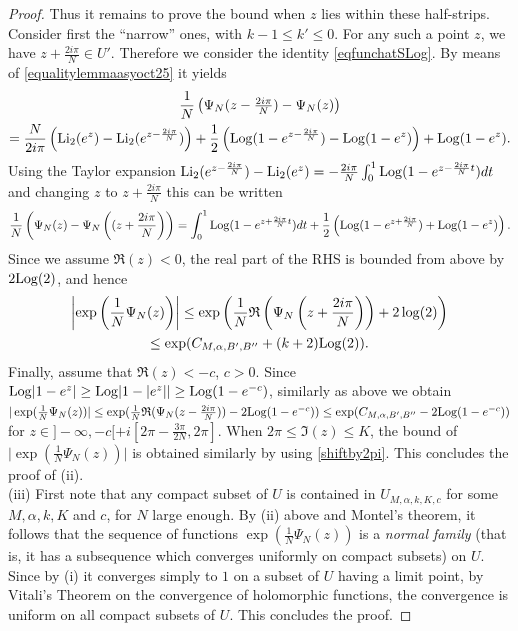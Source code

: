 \documentclass[11pt]{amsart}
\newcommand{\Log}{{\rm Log}}
\begin{document}
{\begin{proof}
Thus it remains to prove the bound when $z$ lies within these half-strips. Consider first the ``narrow'' ones, with $k-1\leq k'\leq 0$. For any such a point $z$, we have $z+\textstyle{\frac{2i\pi}{N}}\in U'$. Therefore we consider the identity \eqref{eqfunchatSLog}. By means of \eqref{equalitylemmaasyoct25} it yields
\begin{multline*}
\frac{1}{N}  \left(\Psi_N(z-\textstyle{\frac{2i\pi}{N}}) - \Psi_N(z)\right)   \\ = \frac{N}{2i\pi}\left({\rm Li_2}(e^{z})-{\rm Li_2}(e^{z-\frac{2i\pi}{N}}) \right) +\frac{1}{2}\left(\Log(1-e^{z-\frac{2i\pi}{N}})-\Log(1-e^{z}) \right)+ \Log(1-e^{z}).
\end{multline*}
Using the Taylor expansion $\textstyle {\rm Li_2}(e^{z-\frac{2i\pi}{N}}) - {\rm Li_2}(e^{z})  = - \frac{2i\pi}{N} \int_0^1 \Log(1-e^{z-\frac{2i\pi}{N}t}) dt$ and changing $z$ to $\textstyle  z+\frac{2i\pi}{N}$ this can be written
$$\frac{1}{N}  \left(\Psi_N(z) - \Psi_N\left((z+\frac{2i\pi}{N}\right)\right) = \int_0^1 \Log(1-e^{z+\frac{2i\pi}{N}t}) dt +\frac{1}{2}\left(\Log(1-e^{z+\frac{2i\pi}{N}})+\Log(1-e^{z}) \right).$$
Since we assume $\mathfrak{R}(z)<0$, the real part of the RHS is bounded from above by $2\Log(2)$, and hence
\begin{multline*}\left\vert \exp\left(\frac{1}{N} \Psi_N(z)\right)\right\vert \leq \exp\left(\frac{1}{N} \mathfrak{R}\left(\Psi_N\left(z+\frac{2i\pi}{N}\right)\right)+2\log(2)\right)\\ \leq \exp(C_{M,\alpha,B',B''}+(k+2)\Log(2)).
\end{multline*}
Finally, assume that $\mathfrak{R}(z)<-c$, $c>0$. Since $\Log\vert 1-e^{z}\vert\ge \Log\vert 1-\vert e^{z}\vert \vert \geq \Log( 1-e^{-c})$, similarly as above we obtain $\textstyle \vert \exp(\frac{1}{N} \Psi_N(z))\vert \leq \exp(\frac{1}{N} \mathfrak{R}(\Psi_N(z-\frac{2i\pi}{N}))- 2\Log( 1-e^{-c}))\leq \exp(C_{M,\alpha,B',B''}- 2\Log( 1-e^{-c}))$ for $z\in \textstyle ]-\infty,-c[ +i[2\pi-\frac{3\pi}{2N}, 2\pi]$. When $2\pi \leq \mathfrak{I}(z)\leq K$, the bound of $\textstyle \vert \exp(\frac{1}{N} \Psi_N(z))\vert$ is obtained similarly by using \eqref{shiftby2pi}. This concludes the proof of (ii).\\ 
(iii) First note that any compact subset of $U$ is contained in $U_{M,\alpha,k,K,c}$ for some $M,\alpha,k,K$ and $c$, for $N$ large enough. By (ii) above and Montel's theorem, it follows that the sequence of functions $\textstyle \exp(\frac{1}{N} \Psi_N(z))$ is a {\it normal family} (that is, it has a subsequence which converges uniformly on compact subsets) on $U$. Since by (i) it converges simply to $1$ on a subset of $U$ having a limit point, by Vitali's Theorem on the convergence of holomorphic functions, the convergence is uniform on all compact subsets of $U$. This concludes the proof.
\end{proof}
 
}
\end{document}
